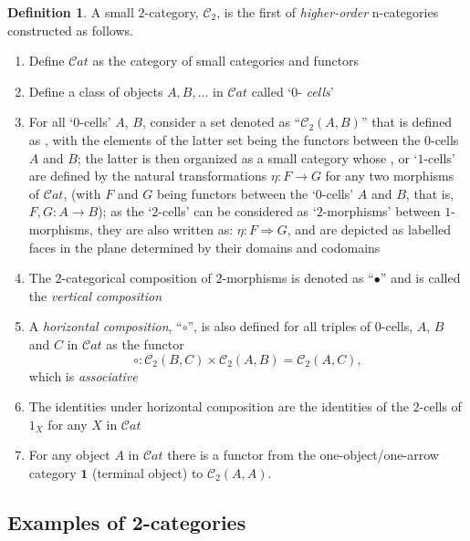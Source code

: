 \documentclass[12pt]{article}
\theoremstyle{plain}
\theoremstyle{definition}
\newtheorem{definition}{Definition}[section]
\numberwithin{equation}{section}
\begin{document}
\begin{definition} 

A small $2$-category, $\mathcal{C}_2$, is the first of {\em higher-order} n-categories 
constructed as follows.

\begin{enumerate}
\item Define $\mathcal{C}at$ as the category of small categories and functors
\item Define a class of objects $A, B,...$ in $\mathcal{C}at$ called `$0$- \emph{cells}' 
\item For all `$0$-cells' $A$, $B$, consider a set denoted as ``$\mathcal{C}_2 (A,B)$'' that is defined as 
, with the elements of the latter set being the functors between the $0$-cells $A$ and $B$; the latter is then organized as a small category whose , or `$1$-cells' are defined by the natural transformations $\eta: F \to G$ for any two morphisms of $\mathcal{C}at$, (with $F$ and $G$ being functors between the `$0$-cells' $A$ and $B$, that is, $F,G: A \to  B$); as the `$2$-cells' can be considered as `$2$-morphisms' between $1$-morphisms, they are also written as: $\eta : F \Rightarrow  G$, and are depicted as labelled faces in the plane determined by their domains and codomains 
\item The $2$-categorical composition of $2$-morphisms is denoted as ``$\bullet$'' and is called the \emph{vertical composition}
\item A \emph{horizontal composition}, ``$\circ$'', is also defined for all triples of $0$-cells, $A$, $B$ and
$C$ in $\mathcal{C}at$ as the functor $$\circ: \mathcal{C}_2(B,C) \times \mathcal{C}_2(A,B) = \mathcal{C}_2(A,C),$$
which is \emph{associative}
\item The identities under horizontal composition are the identities of the $2$-cells of $1_X$
for any $X$ in $\mathcal{C}at$
\item For any object $A$ in $\mathcal{C}at$ there is a functor from the one-object/one-arrow category
$\textbf{1}$ (terminal object) to $\mathcal{C}_2(A,A)$. 
\end{enumerate}
\end{definition}

\subsection{Examples of 2-categories}
\end{document}
